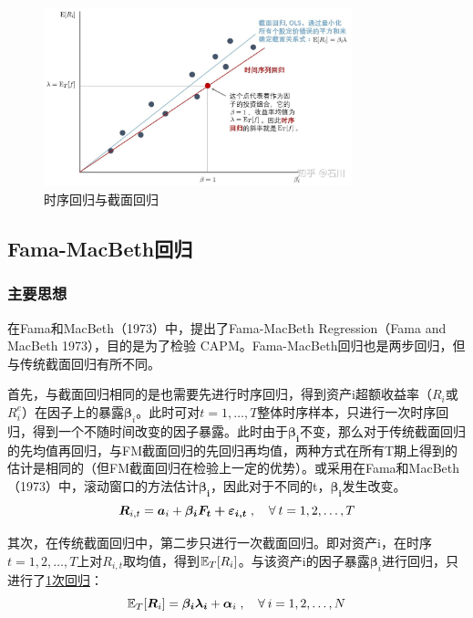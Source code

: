 \documentclass[11pt]{article}
\begin{document}
\begin{figure}[H]
    \centering
    \includegraphics[width=0.8\textwidth]{fig/ts_vs_cs.jpg}
    \caption{时序回归与截面回归}
    \label{fig:ts_vs_cs}
\end{figure}

\subsection{Fama-MacBeth回归}

\subsubsection{主要思想}

在Fama和MacBeth（1973）中，提出了Fama-MacBeth Regression（Fama and MacBeth 1973），目的是为了检验 CAPM。Fama-MacBeth回归也是两步回归，但与传统截面回归有所不同。

首先，与截面回归相同的是也需要先进行时序回归，得到资产i超额收益率（$R_i$或$R_i^e$）在因子上的暴露$\bm{\beta}_i$。此时可对$t=1,\dots,T$整体时序样本，只进行一次时序回归，得到一个不随时间改变的因子暴露。此时由于$\bm{\beta_i}$不变，那么对于传统截面回归的先均值再回归，与FM截面回归的先回归再均值，两种方式在所有T期上得到的估计是相同的（但FM截面回归在检验上一定的优势）。或采用在Fama和MacBeth（1973）中，滚动窗口的方法估计$\bm{\beta_i}$，因此对于不同的t，$\bm{\beta_i}$发生改变。
\begin{equation*}
    \bm{R}_{i,t} = \bm{a}_i + \bm{\beta_{i} \bm{F}_t + \bm{\varepsilon}_{i,t}} \inlinesep \forall t=1,2,\dots,T
\end{equation*}

其次，在传统截面回归中，第二步只进行一次截面回归。即对资产i，在时序$t=1,2,\dots,T$上对$R_{i,t}$取均值，得到$\mathbb{E}_T[R_i]$。与该资产i的因子暴露$\bm{\beta}_i$进行回归，只进行了\uline{1次回归}：
\begin{equation*}
    \E_T[\bm{R}_i] = \bm{\beta_{i} \lambda_i} + \bm{\alpha}_i \inlinesep \forall i=1,2,\dots,N
\end{equation*}
\end{document}
